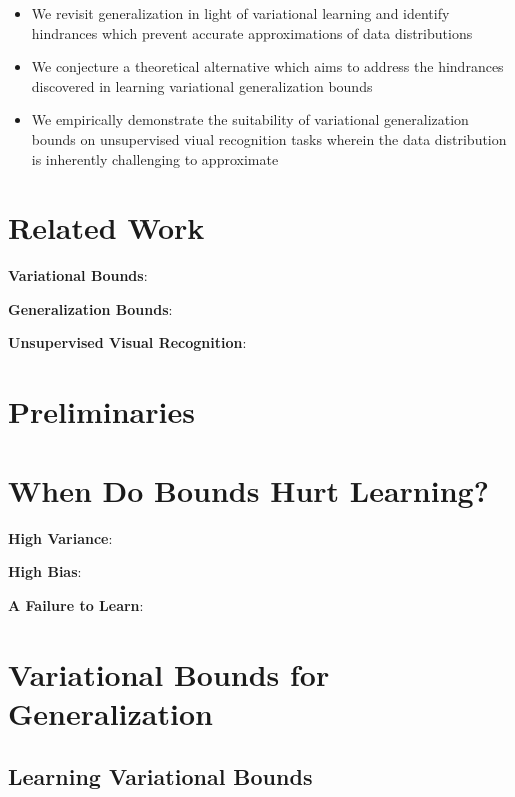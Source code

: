 \documentclass{article}
\begin{document}
\begin{itemize}
    \item We revisit generalization in light of variational learning and identify hindrances which prevent accurate  approximations of data distributions 
    \item We conjecture a theoretical alternative which aims to address the hindrances discovered in learning variational generalization bounds
    \item We empirically demonstrate the suitability of variational generalization bounds on unsupervised viual recognition tasks wherein the data distribution is inherently challenging to approximate  
  \end{itemize}



\section{Related Work}
\textbf{Variational Bounds}:

\textbf{Generalization Bounds}:

\textbf{Unsupervised Visual Recognition}:

\section{Preliminaries}

\section{When Do Bounds Hurt Learning?}

\textbf{High Variance}:

\textbf{High Bias}: 

\textbf{A Failure to Learn}: 

\section{Variational Bounds for Generalization}

\subsection{Learning Variational Bounds}
\end{document}
